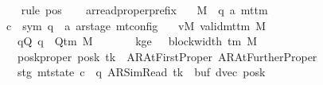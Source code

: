 \begin{isabellebody}
\ \ \ \ \ \ \isamarkupfalse%
\ {\isacharparenleft}{\kern0pt}rule\ pos{}{\isacharparenright}{\kern0pt}\isanewline
\ \ \isamarkupfalse%
\isanewline
{}\isamarkupfalse%
%
\endisatagproof
{\isafoldproof}%
%
\isadelimproof
\isanewline
%
\endisadelimproof
\isanewline
{}\isamarkupfalse%
\ ar{\isacharunderscore}{\kern0pt}read{\isacharunderscore}{\kern0pt}proper{\isacharunderscore}{\kern0pt}prefix{\isacharcolon}{\kern0pt}\isanewline
\ \ \ M\ {\isacharcolon}{\kern0pt}{\isacharcolon}{\kern0pt}\ {\isachardoublequoteopen}{\isacharparenleft}{\kern0pt}{\isacharprime}{\kern0pt}q{\isacharcomma}{\kern0pt}\ {\isacharprime}{\kern0pt}a{\isacharparenright}{\kern0pt}\ mttm{\isachardoublequoteclose}\isanewline
\ \ \ \ \ c{\isacharprime}{\kern0pt}\ {\isacharcolon}{\kern0pt}{\isacharcolon}{\kern0pt}\ {\isachardoublequoteopen}{\isacharparenleft}{\kern0pt}sym{}{\isacharcomma}{\kern0pt}\ {\isacharprime}{\kern0pt}q\ {\isasymtimes}\ {\isacharprime}{\kern0pt}a\ ar{\isacharunderscore}{\kern0pt}stage{\isacharparenright}{\kern0pt}\ mt{\isacharunderscore}{\kern0pt}config{\isachardoublequoteclose}\isanewline
\ \ \ vM{\isacharcolon}{\kern0pt}\ {\isachardoublequoteopen}valid{\isacharunderscore}{\kern0pt}mttm\ M{\isachardoublequoteclose}\isanewline
\ \ \ \ \ \ \ qQ{\isacharcolon}{\kern0pt}\ {\isachardoublequoteopen}q\ {\isasymin}\ Q{\isacharunderscore}{\kern0pt}tm\ M{\isachardoublequoteclose}\isanewline
\ \ \ \ \ \ \ kge{}{\isacharcolon}{\kern0pt}\ {\isachardoublequoteopen}{}\ {\isasymle}\ block{\isacharunderscore}{\kern0pt}width\ {\isacharparenleft}{\kern0pt}{\isasymGamma}{\isacharunderscore}{\kern0pt}tm\ M{\isacharparenright}{\kern0pt}{\isachardoublequoteclose}\isanewline
\ \ \ \ \ \ \ posk{\isacharunderscore}{\kern0pt}proper{\isacharcolon}{\kern0pt}\ {\isachardoublequoteopen}posk\ tk\ {\isasymin}\ {\isacharbraceleft}{\kern0pt}AR{\isacharunderscore}{\kern0pt}AtFirstProper{\isacharcomma}{\kern0pt}\ AR{\isacharunderscore}{\kern0pt}AtFurtherProper{\isacharbraceright}{\kern0pt}{\isachardoublequoteclose}\isanewline
\ \ \ \ \ \ \ stg{\isacharcolon}{\kern0pt}\ {\isachardoublequoteopen}mt{\isacharunderscore}{\kern0pt}state\ c{\isacharprime}{\kern0pt}\ {\isacharequal}{\kern0pt}\ {\isacharparenleft}{\kern0pt}q{\isacharcomma}{\kern0pt}\ AR{\isacharunderscore}{\kern0pt}SimRead{\isacharcomma}{\kern0pt}\ tk{\isacharcomma}{\kern0pt}\ {}{\isacharcomma}{\kern0pt}\ buf{\isacharcomma}{\kern0pt}\ dvec{\isacharcomma}{\kern0pt}\ posk{\isacharparenright}{\kern0pt}{\isachardoublequoteclose}\isanewline

\end{isabellebody}

